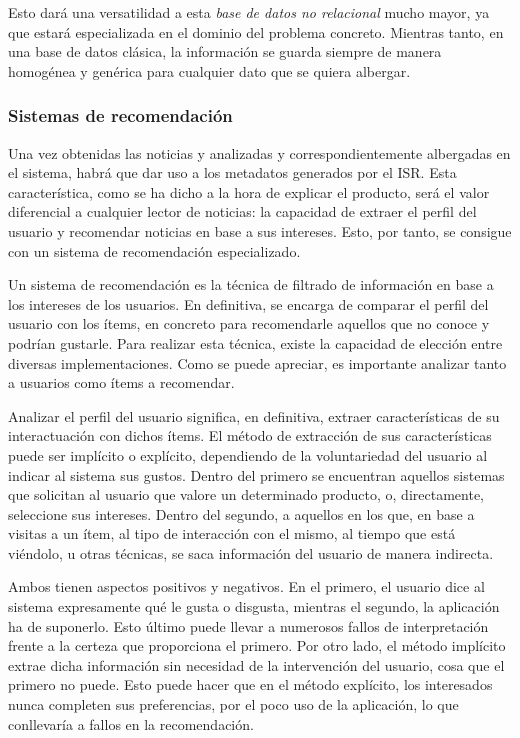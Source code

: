 Esto dará una versatilidad a esta \textit{base de datos no relacional} mucho mayor, ya que estará especializada en el dominio del problema concreto. Mientras tanto, en una base de datos clásica, la información se guarda siempre de manera homogénea y genérica para cualquier dato que se quiera albergar.

\subsubsection{Sistemas de recomendación}
Una vez obtenidas las noticias y analizadas y correspondientemente albergadas en el sistema, habrá que dar uso a los metadatos generados por el ISR. Esta característica, como se ha dicho a la hora de explicar el producto, será el valor diferencial a cualquier lector de noticias: la capacidad de extraer el perfil del usuario y recomendar noticias en base a sus intereses. Esto, por tanto, se consigue con un sistema de recomendación especializado.


Un sistema de recomendación es la técnica de filtrado de información en base a los intereses de los usuarios. En definitiva, se encarga de comparar el perfil del usuario con los ítems, en concreto para recomendarle aquellos que no conoce y podrían gustarle. Para realizar esta técnica, existe la capacidad de elección entre diversas implementaciones. Como se puede apreciar, es importante analizar tanto a usuarios como ítems a recomendar.

Analizar el perfil del usuario significa, en definitiva, extraer características de su interactuación con dichos ítems. El método de extracción de sus características puede ser implícito o explícito, dependiendo de la voluntariedad del usuario al indicar al sistema sus gustos. Dentro del primero se encuentran aquellos sistemas que solicitan al usuario que valore un determinado producto, o, directamente, seleccione sus intereses. Dentro del segundo, a aquellos en los que, en base a visitas a un ítem, al tipo de interacción con el mismo, al tiempo que está viéndolo, u otras técnicas, se saca información del usuario de manera indirecta.

Ambos tienen aspectos positivos y negativos. En el primero, el usuario dice al sistema expresamente qué le gusta o disgusta, mientras el segundo, la aplicación ha de suponerlo. Esto último puede llevar a numerosos fallos de interpretación frente a la certeza que proporciona el primero. Por otro lado, el método implícito extrae dicha información sin necesidad de la intervención del usuario, cosa que el primero no puede. Esto puede hacer que en el método explícito, los interesados nunca completen sus preferencias, por el poco uso de la aplicación, lo que conllevaría a fallos en la recomendación.

